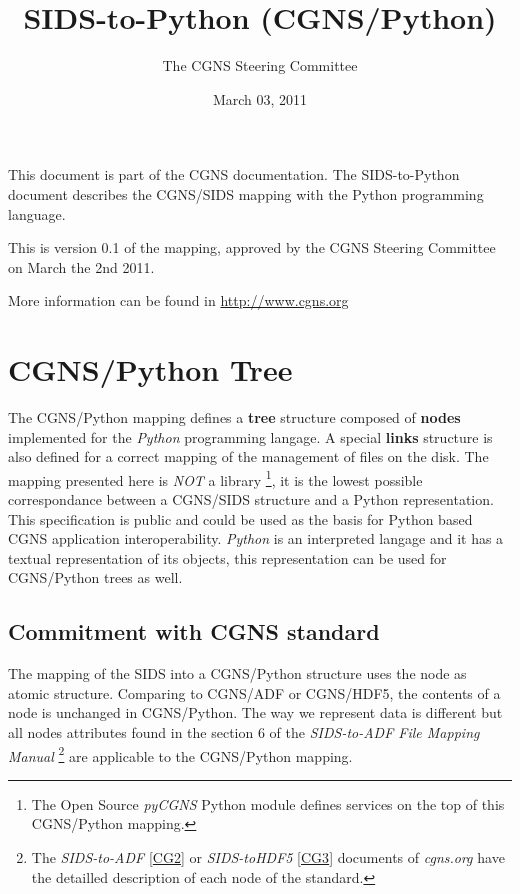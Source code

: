 \documentclass[a4paper,10pt,english]{sphinxmanual}
\title{SIDS-to-Python (CGNS/Python)}
\date{March 03, 2011}
\author{The CGNS Steering Committee}
\begin{document}
\maketitle
\tableofcontents
{}\label{index::doc}


This document is part of the CGNS documentation.
The SIDS-to-Python document describes the CGNS/SIDS mapping with
the Python programming language.

This is version 0.1 of the mapping, approved by the CGNS Steering Committee
on March the 2nd 2011.

More information can be found in \href{http://www.cgns.org}{http://www.cgns.org}


\chapter{CGNS/Python Tree}
\label{sids-to-python::doc}\label{sids-to-python:reference-sids-to-python}\label{sids-to-python:sids-to-python}\label{sids-to-python:cgns-python-tree}
The CGNS/Python mapping defines a \textbf{tree} structure composed of
\textbf{nodes} implemented for the \emph{Python} programming langage.
A special \textbf{links} structure is also defined for a correct mapping of
the management of files on the disk.
The mapping presented here is \emph{NOT} a library \footnote{
The Open Source \emph{pyCGNS} Python module defines services on the top
of this CGNS/Python mapping.
}, it is the lowest possible
correspondance between a CGNS/SIDS structure and a Python
representation.
This specification is public and could be used as the basis for Python
based CGNS application interoperability.
\emph{Python} is an interpreted langage and it has a textual representation of
its objects, this representation can be used for CGNS/Python trees as well.


\section{Commitment with CGNS standard}
\label{sids-to-python:commitment-with-cgns-standard}
The mapping of the SIDS into a CGNS/Python structure uses the node as atomic
structure. Comparing to CGNS/ADF or CGNS/HDF5, the contents
of a node is
unchanged in CGNS/Python. The way we represent data is different but all
nodes attributes found in the section 6 of
the \emph{SIDS-to-ADF File Mapping Manual} \footnote{
The \emph{SIDS-to-ADF} {\hyperref[sids-to-python:cg2]{{[}CG2{]}}} or \emph{SIDS-toHDF5} {\hyperref[sids-to-python:cg3]{{[}CG3{]}}} documents
of \emph{cgns.org} have the
detailled description of each node of the standard.
} are applicable to the
CGNS/Python mapping.
\end{document}
